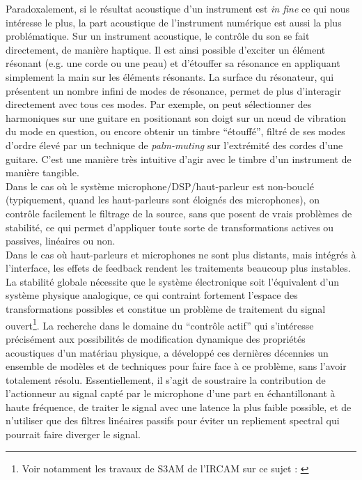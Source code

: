 \indent Paradoxalement, si le résultat acoustique d'un instrument est \textit{in fine} ce qui nous intéresse le plus, la part acoustique de l'instrument numérique est aussi la plus problématique. Sur un instrument acoustique, le contrôle du son se fait directement, de manière haptique. Il est ainsi possible d'exciter un élément résonant (e.g. une corde ou une peau) et d'étouffer sa résonance en appliquant simplement la main sur les éléments résonants. La surface du résonateur, qui présentent un nombre infini de modes de résonance, permet de plus d'interagir directement avec tous ces modes. Par exemple, on peut sélectionner des harmoniques sur une guitare en positionant son doigt sur un nœud de vibration du mode en question, ou encore obtenir un timbre ``étouffé'', filtré de ses modes d'ordre élevé par un technique de \textit{palm-muting} sur l'extrémité des cordes d'une guitare. C'est une manière très intuitive d'agir avec le timbre d'un instrument de manière tangible.\\
\indent Dans le cas où le système microphone/DSP/haut-parleur est non-bouclé (typiquement, quand les haut-parleurs sont éloignés des microphones), on contrôle facilement le filtrage de la source, sans que posent de vrais problèmes de stabilité, ce qui permet d'appliquer toute sorte de transformations actives ou passives, linéaires ou non.\\
\indent Dans le cas où haut-parleurs et microphones ne sont plus distants, mais intégrés à l'interface, les effets de feedback rendent les traitements beaucoup plus instables. La stabilité globale nécessite que le système électronique soit l'équivalent d'un système physique analogique\cite{berdahl_feedback_2012}, ce qui contraint fortement l'espace des transformations possibles et constitue un problème de traitement du signal ouvert\footnote{Voir notamment les travaux de S3AM de l'\gls{IRCAM} sur ce sujet : \cite{muller_power-balanced_2018, falaize_passive_2018, muller_minimal_2019}}. La recherche dans le domaine du ``contrôle actif'' qui s'intéresse précisément aux possibilités de modification dynamique des propriétés acoustiques d'un matériau physique, a développé ces dernières décennies un ensemble de modèles \cite{boutin_active_2011, benacchio_mode_2015, meurisse_active_2015, pardue_separating_2019} et de techniques pour faire face à ce problème, sans l'avoir totalement résolu. Essentiellement, il s'agit de soustraire la contribution de l'actionneur au signal capté par le microphone d'une part en échantillonant à haute fréquence, de traiter le signal avec une latence la plus faible possible, et de n'utiliser que des filtres linéaires passifs pour éviter un repliement spectral qui pourrait faire diverger le signal.\\
